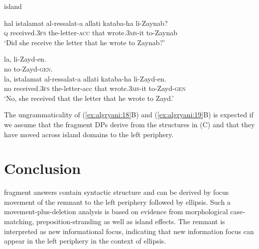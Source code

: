 \documentclass[output=paper]{LSP/langsci}
\begin{document}
\pagebreak
\ea%
\label{ex:algryani:19}
 island \\
\begin{xlist}
\gll hal istalamat al-ressalat-a allati kataba-ha li-Zaynab?\\
 \textsc{q} received.\textsc{3fs} the-letter-\textsc{acc} that wrote.\textsc{3ms}-it to-Zaynab\\
\glt  ‘Did she receive the letter that he wrote to Zaynab?’~

\gll  *la, li-Zayd-en.\\
 no to-Zayd-\textsc{gen}. \\

\gll la, istalamat al-ressalat-a allati kataba-ha li-Zayd-en.\\
no received.\textsc{3fs} the-letter-acc that wrote.\textsc{3ms}-it to-Zayd-\textsc{gen}\\
 \glt  ‘No, she received that the letter that he wrote to Zayd.’\\
\end{xlist}
\z


The ungrammaticality of (\ref{ex:algryani:18}B) and (\ref{ex:algryani:19}B) is expected if we assume that the fragment DPs derive from the structures in (C) and that they have moved across island domains to the left periphery.


\section{Conclusion}\label{sec:algryani:4}
 fragment answers contain syntactic structure and can be derived by focus movement of the remnant to the left periphery followed by  ellipsis. Such a movement-plus-deletion analysis is based on evidence from morphological case-matching, preposition-stranding as well as island effects. The remnant is interpreted as new informational focus, indicating that new information focus can appear in the left periphery in the context of ellipsis.


\sloppy
\printbibliography[heading=subbibliography,notkeyword=this]
\end{document}
